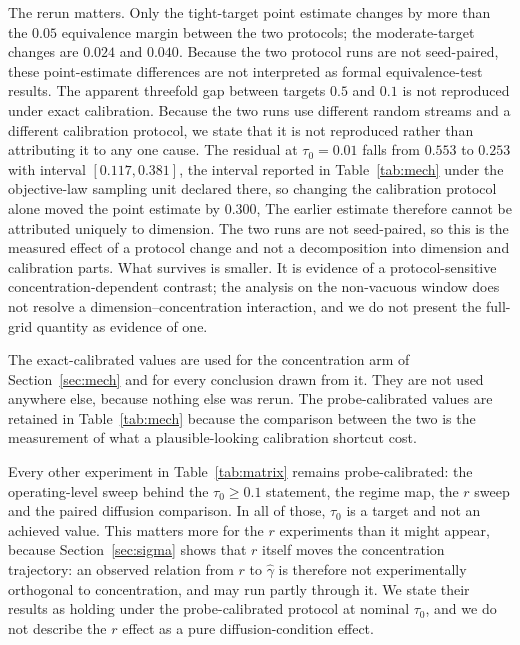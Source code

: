 \documentclass[pdflatex,sn-mathphys-num]{sn-jnl}
\theoremstyle{thmstyleone}
\theoremstyle{thmstyletwo}
\theoremstyle{thmstylethree}
\begin{document}
The rerun matters. Only the tight-target point estimate changes by more than the $0.05$ equivalence margin between the two protocols; the moderate-target changes are $0.024$ and $0.040$. Because the two protocol runs are not seed-paired, these point-estimate differences are not interpreted as formal equivalence-test results. The apparent threefold gap between targets $0.5$ and $0.1$ is not reproduced under exact calibration. Because the two runs use different random streams and a different calibration protocol, we state that it is not reproduced rather than attributing it to any one cause. The residual at $\tau_0=0.01$ falls from $0.553$ to $0.253$ with interval $[0.117,0.381]$, the interval reported in Table~\ref{tab:mech} under the objective-law sampling unit declared there, so changing the calibration protocol alone moved the point estimate by $0.300$, The earlier estimate therefore cannot be attributed uniquely to dimension. The two runs are not seed-paired, so this is the measured effect of a protocol change and not a decomposition into dimension and calibration parts. What survives is smaller. It is evidence of a protocol-sensitive concentration-dependent contrast; the analysis on the non-vacuous window does not resolve a dimension--concentration interaction, and we do not present the full-grid quantity as evidence of one.

The exact-calibrated values are used for the concentration arm of Section~\ref{sec:mech} and for every conclusion drawn from it. They are not used anywhere else, because nothing else was rerun. The probe-calibrated values are retained in Table~\ref{tab:mech} because the comparison between the two is the measurement of what a plausible-looking calibration shortcut cost.

Every other experiment in Table~\ref{tab:matrix} remains probe-calibrated: the operating-level sweep behind the $\tau_0\ge0.1$ statement, the regime map, the $r$ sweep and the paired diffusion comparison. In all of those, $\tau_0$ is a target and not an achieved value. This matters more for the $r$ experiments than it might appear, because Section~\ref{sec:sigma} shows that $r$ itself moves the concentration trajectory: an observed relation from $r$ to $\hat\gamma$ is therefore not experimentally orthogonal to concentration, and may run partly through it. We state their results as holding under the probe-calibrated protocol at nominal $\tau_0$, and we do not describe the $r$ effect as a pure diffusion-condition effect.
\end{document}
